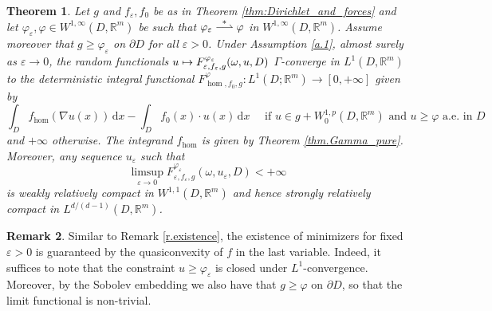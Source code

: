 \documentclass[11pt]{article}
\numberwithin{equation}{section}
\def\mto{\mathchoice{\longmapsto}{\mapsto}{\mapsto}{\mapsto}}
\def\harptod{\mathrel{\relbar\joinrel\rightharpoonup}}
\def\harpto{\mathchoice{\harptod}{\rightharpoonup}{\rightharpoonup}{\rightharpoonup}}
\def\harptostar{\mathchoice{\overset{\textstyle*}{\harpto}}{\overset{*}{\harptod}}{\overset{*}{\rightharpoonup}}{\overset{*}{\rightharpoonup}}}
\newtheorem{theorem}{Theorem}[section]
\theoremstyle{definition}
\newtheorem{remark}[theorem]{Remark}
\let\e\varepsilon
\let\w\omega
\newcommand{\dx}{\,\mathrm{d}x}
\newcommand{\R}{\mathbb{R}}
\begin{document}
\begin{theorem}\label{thm.obstacle}
Let $g$ and $f_{\e},f_0$ be as in Theorem \ref{thm:Dirichlet_and_forces} and let $\varphi_{\e},\varphi\in W^{1,\infty}(D,\R^m)$ be such that $\varphi_{\e}\harptostar\varphi$ in $W^{1,\infty}(D,\R^m)$. Assume moreover that $g\geq\varphi_{\e}$ on $\partial D$ for all $\e>0$. Under Assumption \ref{a.1}, almost surely as $\e\to 0$, the random functionals $u\mto F^{\varphi_{\e}}_{\e,f_{\e},g}(\w,u,D)$ $\Gamma$-converge in $L^1(D,\R^m)$ to the deterministic integral functional $F^{\varphi}_{\hom,f_0,g}:L^1(D;\R^m)\to [0,+\infty]$ given by
\begin{equation*}
\int_D f_{\hom}(\nabla u(x))\dx-\int_Df_0(x)\cdot u(x)\dx \quad\text{ if }u\in g+W^{1,p}_0(D,\R^m)\text{ and }u\geq\varphi\text{ a.e.\ in }D
\end{equation*}
and $+\infty$ otherwise. The integrand $f_{\hom}$ is given by Theorem \ref{thm.Gamma_pure}. Moreover, any sequence $u_{\e}$ such that
\begin{equation*}
\limsup_{\e\to 0}F^{\varphi_{\e}}_{\e,f_{\e},g}(\w,u_{\e},D)<+\infty
\end{equation*}
is weakly relatively compact in $W^{1,1}(D,\R^m)$ and hence strongly relatively compact in $L^{d/(d-1)}(D,\R^m)$.
\end{theorem}
\begin{remark}
Similar to Remark \ref{r.existence}, the existence of minimizers for fixed $\e>0$ is guaranteed by the quasiconvexity of $f$ in the last variable. Indeed, it suffices to note that the constraint $u\geq\varphi_{\e}$ is closed under $L^1$-convergence. Moreover, by the Sobolev embedding we also have that $g\geq \varphi$ on $\partial D$, so that the limit functional is non-trivial.
\end{remark}
\end{document}
